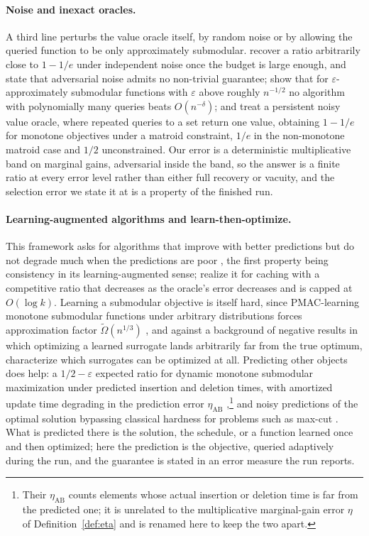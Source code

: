 \paragraph{Noise and inexact oracles.}
A third line perturbs the value oracle itself, by random noise or by allowing
the queried function to be only approximately submodular.
\citet{hassidim2017submodular} recover a ratio arbitrarily close to $1-1/e$
under independent noise once the budget is large enough, and state that
adversarial noise admits no non-trivial guarantee;
\citet[Theorem~3]{horel2016maximization} show that for
$\varepsilon$-approximately submodular functions with $\varepsilon$ above
roughly $n^{-1/2}$ no algorithm with polynomially many queries beats
$O(n^{-\delta})$; and \citet{bhawalkar2025unified} treat a persistent noisy
value oracle, where repeated queries to a set return one value, obtaining
$1-1/e$ for monotone objectives under a matroid constraint, $1/e$ in the
non-monotone matroid case and $1/2$ unconstrained.  Our error is a
deterministic multiplicative band on marginal gains, adversarial inside the
band, so the answer is a finite ratio at every error level rather than either
full recovery or vacuity, and the selection error we state it at is a
property of the finished run.

\paragraph{Learning-augmented algorithms and learn-then-optimize.}
This framework asks for algorithms that improve with better predictions but
do not degrade much when the predictions are poor
\citep{purohit2018improving}, the first property being consistency in its
learning-augmented sense; \citet{lykouris2021competitive} realize it for
caching with a competitive ratio that decreases as the oracle's error
decreases and is capped at $O(\log k)$.  Learning a submodular objective is
itself hard, since PMAC-learning monotone submodular functions under
arbitrary distributions forces approximation factor $\tilde\Omega(n^{1/3})$
\citep{balcan2018submodular}, and against a background of negative results in
which optimizing a learned surrogate lands arbitrarily far from the true
optimum, \citet{rosenfeld2018learning} characterize which surrogates can be
optimized at all.  Predicting other objects does help: a
$1/2-\varepsilon$ expected ratio for dynamic monotone submodular
maximization under predicted insertion and deletion times, with amortized
update time degrading in the prediction error $\eta_{\mathrm{AB}}$
\citep{agarwal2024learning},\footnote{Their $\eta_{\mathrm{AB}}$ counts
elements whose actual insertion or deletion time is far from the predicted
one; it is unrelated to the multiplicative marginal-gain error $\eta$ of
Definition~\ref{def:eta} and is renamed here to keep the two apart.} and
noisy predictions of the optimal solution bypassing classical hardness for
problems such as max-cut \citep{cohenaddad2024learning}.  What is predicted
there is the solution, the schedule, or a function learned once and then
optimized; here the prediction is the objective, queried adaptively during
the run, and the guarantee is stated in an error measure the run reports.

